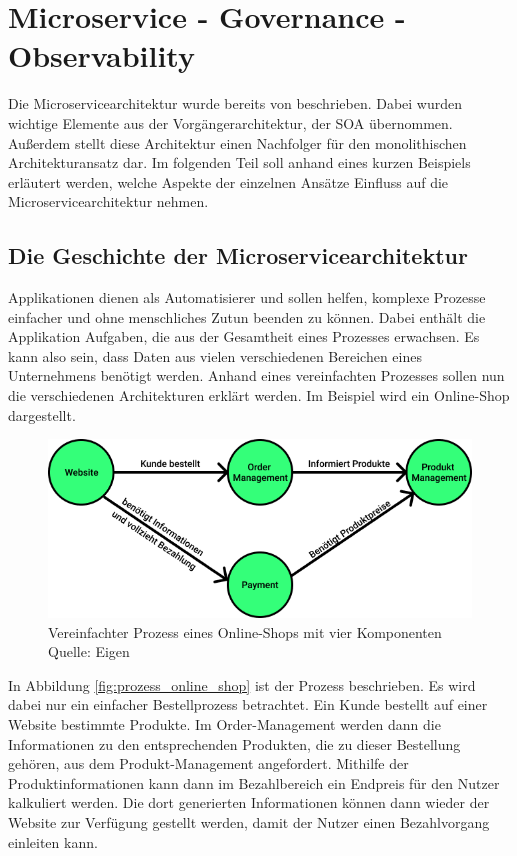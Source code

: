 \chapter{Microservice - Governance - Observability}

Die Microservicearchitektur wurde bereits \citeyear{FowlerMicrservices} von \citeauthor{FowlerMicrservices} beschrieben. Dabei wurden wichtige Elemente aus der Vorgängerarchitektur, der \ac{SOA} übernommen. Außerdem stellt diese Architektur einen Nachfolger für den monolithischen Architekturansatz dar. Im folgenden Teil soll anhand eines kurzen Beispiels erläutert werden, welche Aspekte der einzelnen Ansätze Einfluss auf die Microservicearchitektur nehmen.\autocites{Ren2018}{Mazlami2017}{Escobar2016}

\section{Die Geschichte der Microservicearchitektur}

Applikationen dienen als Automatisierer und sollen helfen, komplexe Prozesse einfacher und ohne menschliches Zutun beenden zu können. Dabei enthält die Applikation Aufgaben, die aus der Gesamtheit eines Prozesses erwachsen. Es kann also sein, dass Daten aus vielen verschiedenen Bereichen eines Unternehmens benötigt werden. Anhand eines vereinfachten Prozesses sollen nun die verschiedenen Architekturen erklärt werden. Im Beispiel wird ein Online-Shop dargestellt.

\begin{figure}[h]
	\centering
	\includegraphics[width=1.0\linewidth]{img/prozess_eCommernce.png}
	\caption[Prozess Online-Shop]{Vereinfachter Prozess eines Online-Shops mit vier Komponenten\\ Quelle: Eigen}
	\label{fig:prozess_online_shop}
\end{figure}

In Abbildung \vref{fig:prozess_online_shop} ist der Prozess beschrieben. Es wird dabei nur ein einfacher Bestellprozess betrachtet. Ein Kunde bestellt auf einer Website bestimmte Produkte. Im Order-Management werden dann die Informationen zu den entsprechenden Produkten, die zu dieser Bestellung gehören, aus dem Produkt-Management angefordert. Mithilfe der Produktinformationen kann dann im Bezahlbereich ein Endpreis für den Nutzer kalkuliert werden. Die dort generierten Informationen können dann wieder der Website zur Verfügung gestellt werden, damit der Nutzer einen Bezahlvorgang einleiten kann.

